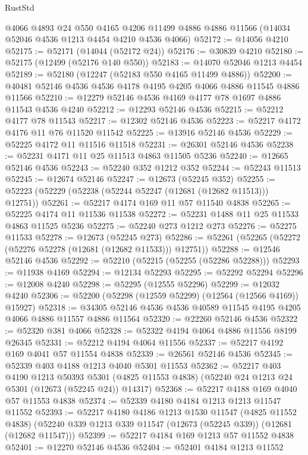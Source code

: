 \begin{lexlean}{RustStd}
\begin{coremodule}
{\begin{coremodule}
{{{{{{{{{{{{{{{{{{{{{{{{{{{{{{{{{{{{{{{{{{{{{{{{{{{{{{{{{{{{{{{{{{{{{{{{{{{{{{{{    @4066
    @4893
    @24
    @550
    @4165
    @4206
    @11499
    @4886
    @4886
    @11566
    (@14034 @52046 @4536 @1213 @4454 @4210 @4536 @4066)
@52172 := @14056 @4210
@52175 := @52171 (@14044 (@52172 @24))
@52176 := @30839 @4210
@52180 := @52175 (@12499 (@52176 @140 @550))
@52183 := @14070 @52046 @1213 @4454
@52189 := @52180 (@12247 (@52183 @550 @4165 @11499 @4886))
@52200 := @40481 @52146 @4536 @4536 @4178 @4195 @4205 @4066 @4886 @11545 @4886 @11566
@52210 := @12279 @52146 @4536 @4169 @4177 @78 @1697 @4886 @11543 @4536 @4240
@52212 := @12293 @52146 @4536
@52215 := @52212 @4177 @78 @11543
@52217 := @12302 @52146 @4536
@52223 := @52217 @4172 @4176 @11 @76 @11520 @11542
@52225 := @13916 @52146 @4536
@52229 := @52225 @4172 @11 @11516 @11518
@52231 := @26301 @52146 @4536
@52238 := @52231 @4171 @11 @25 @11513 @4863 @11505 @5236
@52240 := @12665 @52146 @4536
@52243 := @52240 @352 @1212 @352
@52244 := @52243 @11513
@52245 := @12674 @52146
@52247 := @12673 (@52245 @352)
@52255 := @52223 (@52229 (@52238 (@52244 @52247 (@12681 (@12682 @11513))) @12751))
@52261 := @52217 @4174 @169 @11 @57 @11540 @4838
@52265 := @52225 @4174 @11 @11536 @11538
@52272 := @52231 @1488 @11 @25 @11533 @4863 @11525 @5236
@52275 := @52240 @273 @1212 @273
@52276 := @52275 @11533
@52278 := @12673 (@52245 @273)
@52286 := @52261 (@52265 (@52272 (@52276 @52278 (@12681 (@12682 @11533))) @12751))
@52288 := @12546 @52146 @4536
@52292 := @52210 (@52215 (@52255 (@52286 @52288)))
@52293 := @11938 @4169
@52294 := @12134 @52293
@52295 := @52292 @52294
@52296 := @12008 @4240
@52298 := @52295 (@12555 @52296)
@52299 := @12032 @4240
@52306 := @52200 (@52298 (@12559 @52299) (@12564 (@12566 @4169)) @15927)
@52318 := @34305 @52146 @4536 @4536 @40589 @11545 @4195 @4205 @4066 @4886 @11557 @4886 @11564
@52320 := @22260 @52146 @4536
@52322 := @52320 @381 @4066
@52328 := @52322 @4194 @4064 @4886 @11556 @8199 @26345
@52331 := @52212 @4194 @4064 @11556
@52337 := @52217 @4192 @169 @4041 @57 @11554 @4838
@52339 := @26561 @52146 @4536
@52345 := @52339 @403 @4188 @1213 @4040 @5301 @11553
@52362 := @52217
    @403
    @4190
    @1213
    @50393
    @5301
    (@4825 @11553 @4838)
    (@52240 @24 @1213 @24 @5301 (@12673 (@52245 @24)) @14317)
@52368 := @52217 @4188 @169 @4040 @57 @11553 @4838
@52374 := @52339 @4180 @4184 @1213 @1213 @11547 @11552
@52393 := @52217
    @4180
    @4186
    @1213
    @1530
    @11547
    (@4825 @11552 @4838)
    (@52240 @339 @1213 @339 @11547 (@12673 (@52245 @339)) (@12681 (@12682 @11547)))
@52399 := @52217 @4184 @169 @1213 @57 @11552 @4838
@52401 := @12270 @52146 @4536
@52404 := @52401 @4184 @1213 @11552
}}}}}}}}}}}}}}}}}}}}}}}}}}}}}}}}}}}}}}}}}}}}}}}}}}}}}}}}}}}}}}}}}}}}}}}}}}}}}}}}
\end{coremodule}}
\end{coremodule}
\end{lexlean}
